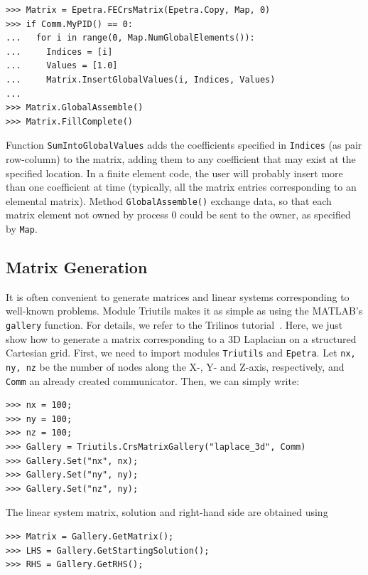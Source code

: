 \documentclass[10pt,relax]{SANDreport}
\begin{document}
\begin{verbatim}
>>> Matrix = Epetra.FECrsMatrix(Epetra.Copy, Map, 0)
>>> if Comm.MyPID() == 0:
...   for i in range(0, Map.NumGlobalElements()):
...     Indices = [i]
...     Values = [1.0]
...     Matrix.InsertGlobalValues(i, Indices, Values)
...
>>> Matrix.GlobalAssemble() 
>>> Matrix.FillComplete()
\end{verbatim}
Function \verb!SumIntoGlobalValues! adds the coefficients specified
in \verb!Indices! (as pair row-column) to the matrix, adding them to any
coefficient that may exist at the specified location. In a finite
element code, the user will probably insert more than one coefficient
at time (typically, all the matrix entries corresponding to an elemental
matrix). Method \verb!GlobalAssemble()! exchange data, so that 
each matrix element not owned by
process 0 could be sent to the owner, as specified by \verb!Map!. 

\subsection{Matrix Generation}
\label{sec:generation}

It is often convenient to generate matrices and linear systems corresponding
to well-known problems. Module Triutils makes it as simple as using the
MATLAB's {\tt gallery} function. For
details, we refer to the Trilinos tutorial~\cite[Chapter
5]{Trilinos-tutorial}. Here, we just show how to generate a matrix
corresponding to a 3D Laplacian on a structured Cartesian grid.  First, we
need to import modules \verb!Triutils! and \verb!Epetra!. Let {\tt nx, ny, nz}
be the number of nodes along the X-, Y- and Z-axis, respectively, and
\verb!Comm! an already created communicator.
  Then, we can simply write:
\begin{verbatim}
>>> nx = 100;
>>> ny = 100;
>>> nz = 100;
>>> Gallery = Triutils.CrsMatrixGallery("laplace_3d", Comm)
>>> Gallery.Set("nx", nx);
>>> Gallery.Set("ny", ny);
>>> Gallery.Set("nz", ny);
\end{verbatim}
The linear system matrix, solution and right-hand side are
obtained using
\begin{verbatim}
>>> Matrix = Gallery.GetMatrix();
>>> LHS = Gallery.GetStartingSolution();
>>> RHS = Gallery.GetRHS();
\end{verbatim}
\end{document}
